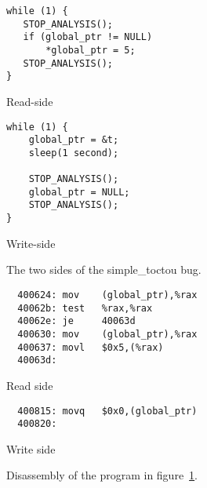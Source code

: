 
\begin{figure}
  \begin{subfloat}
    \begin{minipage}{50mm}
\begin{verbatim}
while (1) {
   STOP_ANALYSIS();
   if (global_ptr != NULL)
       *global_ptr = 5;
   STOP_ANALYSIS();
}
\end{verbatim}
    \end{minipage}
    \caption{Read-side}
  \end{subfloat}
  \begin{subfloat}
    \begin{minipage}{50mm}
\begin{verbatim}
while (1) {
    global_ptr = &t;
    sleep(1 second);

    STOP_ANALYSIS();
    global_ptr = NULL;
    STOP_ANALYSIS();
}
\end{verbatim}
    \end{minipage}
    \caption{Write-side}
  \end{subfloat}
  \label{fig:eval:simple_toctou}
  \caption{The two sides of the simple\_toctou bug.}
\end{figure}

\begin{figure}
  \begin{subfloat}
    \begin{minipage}{70mm}
\begin{verbatim}
  400624: mov    (global_ptr),%rax
  40062b: test   %rax,%rax
  40062e: je     40063d
  400630: mov    (global_ptr),%rax
  400637: movl   $0x5,(%rax)
  40063d:
\end{verbatim}
    \end{minipage}
    \caption{Read side}
  \end{subfloat}
  \begin{subfloat}
    \begin{minipage}{70mm}
\begin{verbatim}
  400815: movq   $0x0,(global_ptr)
  400820:
\end{verbatim}
    \end{minipage}
    \caption{Write side}
  \end{subfloat}
  \label{fig:eval:simple_toctou_compiled}
  \caption{Disassembly of the program in figure~\ref{fig:eval:simple_toctou}.}
\end{figure}

